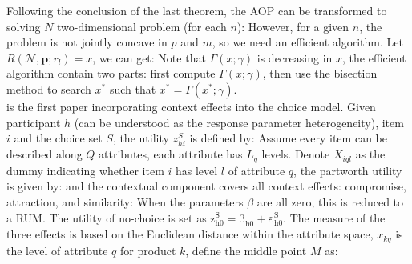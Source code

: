 \documentclass[10pt]{report}
\begin{document}
Following the conclusion of the last theorem, the AOP can be transformed to solving $N$ two-dimensional problem (for each $n$):
However, for a given $n$, the problem is not jointly concave in $p$ and $m$, so we need an efficient algorithm. 
Let $R(\mathcal{N},\mathbf{p};r_l)=x$, we can get:
Note that $\Gamma(x;\gamma)$ is decreasing in $x$, the efficient algorithm contain two parts: first compute $\Gamma(x;\gamma)$, then use the bisection method to search $x^*$ such that $x^*=\Gamma(x^*;\gamma)$.\\
\cite{rooderkerk2011incorporating} is the first paper incorporating context effects into the  choice model. 
Given participant $h$ (can be understood as the response parameter heterogeneity), item $i$ and the choice set $S$, the utility $z_{hi}^S$ is defined by:
Assume every item can be described along $Q$ attributes, each attribute has $L_q$ levels. 
Denote $X_{iql}$ as the dummy indicating whether item $i$ has level $l$ of attribute $q$, the partworth utility is given by:
and the contextual component covers all context effects: compromise, attraction, and similarity:
When the parameters $\beta$ are all zero, this is reduced to a RUM. 
The utility of no-choice is set as $\mathrm{z_{h0}^S=\beta_{h0}+\varepsilon_{h0}^S.}$
The measure of the three effects is based on the Euclidean distance within the attribute space, $x_{kq}$ is the level of attribute $q$ for product $k$, define the middle point $M$ as:
\end{document}
